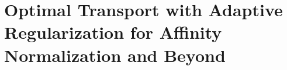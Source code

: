 \chapter{Optimal Transport with Adaptive Regularization for Affinity Normalization and Beyond}
\label{chapter:SNEkhorn}

\minitoc






